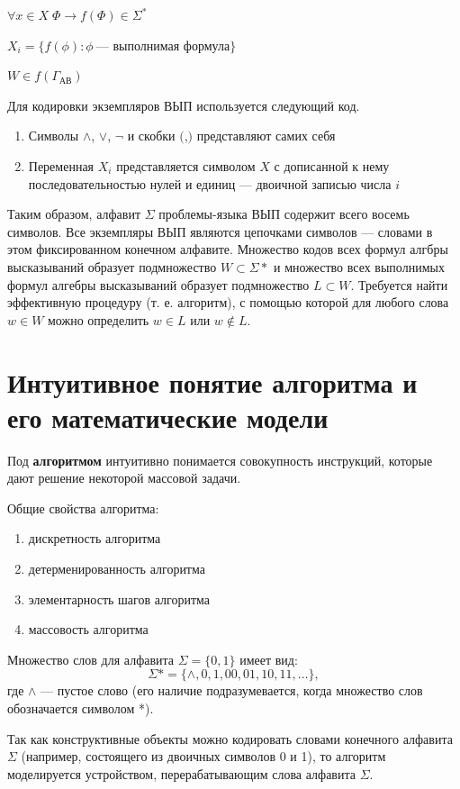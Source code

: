 $\forall x \in X \; \Phi \to f(\Phi) \in \Sigma^*$

$X_i = \{f(\phi): \phi ~ \text{--- выполнимая формула}\}$

$W \in f(\Gamma_{\text{АВ}})$

Для кодировки экземпляров ВЫП используется следующий код.
\begin{enumerate}
    \item Символы $\land$, $\lor$, $\lnot$ и скобки $($,$)$ представляют самих себя
    \item Переменная $X_i$ представляется символом $X$ с дописанной к нему последовательностью нулей и единиц --- двоичной записью числа $i$
\end{enumerate}

Таким образом, алфавит $\Sigma$ проблемы-языка ВЫП содержит всего восемь символов. Все экземпляры ВЫП являются цепочками символов --- словами в этом фиксированном конечном алфавите. Множество кодов всех формул алгбры высказываний образует подмножество $W \subset \Sigma*$ и множество всех выполнимых формул алгебры высказываний образует подмножество $L \subset W$. Требуется найти эффективную процедуру (т. е. алгоритм), с помощью которой для любого слова $w \in W$ можно определить $w \in L$ или $w \not\in L$.

\section{Интуитивное понятие алгоритма и его математические модели}
\dftion Под \textbf{алгоритмом} интуитивно понимается совокупность инструкций, которые дают решение некоторой массовой задачи.

Общие свойства алгоритма:
\begin{enumerate}
    \item дискретность алгоритма
    \item детерменированность алгоритма
    \item элементарность шагов алгоритма
    \item массовость алгоритма
\end{enumerate}

Множество слов для алфавита $\Sigma = \{0, 1\}$ имеет вид:
$$ \Sigma* = \{\land, 0, 1, 00, 01, 10, 11, \dots \}, $$
где $\land$ --- пустое слово (его наличие подразумевается, когда множество слов обозначается символом *).

Так как конструктивные объекты можно кодировать словами конечного алфавита $\Sigma$ (например, состоящего из двоичных символов 0 и 1), то алгоритм моделируется устройством, перерабатывающим слова алфавита $\Sigma$.

